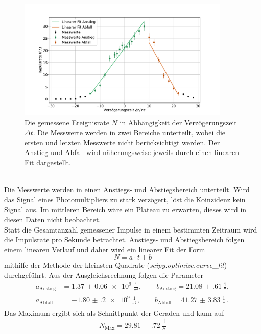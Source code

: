 \begin{figure}
    \centering
    \includegraphics[width=0.9\textwidth]{content/plots/verzoegerungszeit.pdf}
    \caption{Die gemessene Ereignisrate $N$ in Abhängigkeit der Verzögerungszeit $\Delta t$.
    Die Messwerte werden in zwei Bereiche unterteilt, wobei die ersten und letzten Messwerte nicht berücksichtigt werden.
    Der Anstieg und Abfall wird näherungsweise jeweils durch einen linearen Fit dargestellt.}
    \label{fig:verzoegerung}
\end{figure}
\\
Die Messwerte werden in einen Anstiegs- und Abstiegsbereich unterteilt.
Wird das Signal eines Photomultipliers zu stark verzögert, löst die Koinzidenz kein Signal aus.
Im mittleren Bereich wäre ein Plateau zu erwarten, dieses wird in diesen Daten nicht beobachtet.
\\
Statt die Gesamtanzahl gemessener Impulse in einem bestimmten Zeitraum wird die Impulsrate pro Sekunde betrachtet.
Anstiegs- und Abstiegsbereich folgen einem linearen Verlauf und daher wird ein linearer Fit der Form
\begin{equation*}
    N = a \cdot t + b
\end{equation*}
mithilfe der Methode der kleinsten Quadrate (\textit{scipy.optimize.curve\_fit}\cite{scipy}) durchgeführt.
Aus der Ausgleichsrechnung folgen die Parameter
\begin{align*}
    a_\text{Anstieg} &= \qty{1.37(6)e9}{\frac{1}{\second^2}},\qquad b_\text{Anstieg} = \qty{21.08(61)}{\frac{1}{\second}}, \\
    a_\text{Abfall} &= \qty{-1.80(20)e9}{\frac{1}{\second^2}},\qquad b_\text{Abfall} = \qty{41.27(383)}{\frac{1}{\second}} \,.
\end{align*}
Das Maximum ergibt sich als Schnittpunkt der Geraden und kann auf 
\begin{equation}
    N_\text{Max} = \qty{29.81(72)}{\frac{1}{\second}}
\end{equation}
